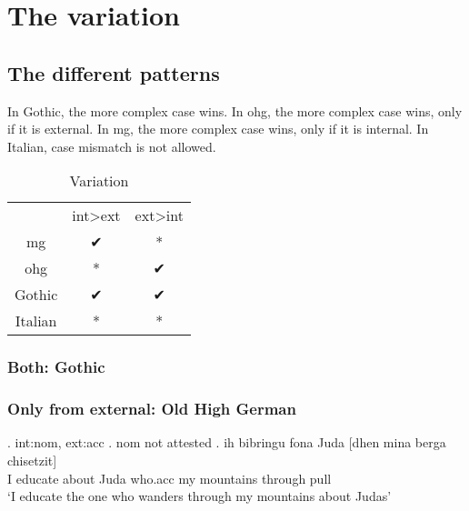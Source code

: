 
\chapter{The variation}


\section{The different patterns}

In Gothic, the more complex case wins.
In \ac{ohg}, the more complex case wins, only if it is external.
In \ac{mg}, the more complex case wins, only if it is internal.
In Italian, case mismatch is not allowed.


\begin{table}[H]
	\center
	\caption {Variation}
		\begin{tabular}{ccc}
		\toprule
		 					& \ac{int}>\ac{ext}		& \ac{ext}>\ac{int}	\\
								\cmidrule{2-3}
		\ac{mg} 	& ✔			 							&	*									\\
		\ac{ohg}	& *										&	✔									\\
		Gothic		&	✔										&	✔									\\
		Italian		&	*										& *									\\
		\bottomrule
		\end{tabular}
\end{table}



\subsection{Both: Gothic}





\subsection{Only from external: Old High German}


\ex. \ac{int}:\ac{nom}, \ac{ext}:\ac{acc}
\a. \ac{nom} not attested
\bg. ih bibringu fona Juda [dhen mina berga chisetzit]\\
 I educate\scsub{[acc]} about Juda who.\ac{acc} my mountains {through pull}\scsub{[nom]}\\
 `I educate the one who wanders through my mountains about Judas' 

